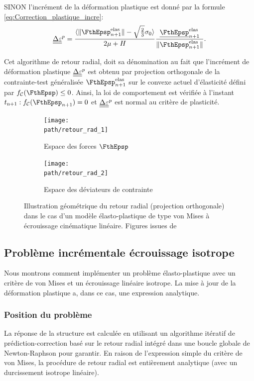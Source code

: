 \documentclass[10pt]{book}
\def\path{./fig}
\begin{document}
\begin{appendices}
\begin{enumerate}
SINON l'incrément de la déformation plastique est donné par la formule \eqref{eq:Correction_plastique_incre}:
$$\DeltaEpsP=\frac{\langle\Vert\FthEpsp_{n+1}^{\text{elas}}\Vert-\sqrt{\frac{2}{3}}\sigma_{0}\rangle}{2\mu+H}\frac{\vec{\FthEpsp}_{n+1}^{\text{elas}}}{\Vert \FthEpsp_{n+1}^{\text{elas}}\Vert}.$$
\end{enumerate}
Cet algorithme de retour radial, doit sa dénomination au fait que l'incrément de déformation plastique $\underline{\underline{\Delta}}\underline{\underline{\varepsilon}}^{p}$ est obtenu par projection orthogonale de la contrainte-test généralisée $\FthEpsp_{n+1}^{\text{elas}}$ sur le convexe actuel d'élasticité défini par $\FChargeConvexe(\FthEpsp) \leq 0$. Ainsi, la loi de comportement est vérifiée à l'instant $t_{\mathrm{n}+1}:\FChargeConvexe(\FthEpsp_{n+1})=0$ et $\underline{\underline{\Delta}}\underline{\underline{\varepsilon}}^{p}$ est normal au critère de plasticité.
\begin{figure}[!h]
\begin{subfigure}[b]{0.49\textwidth}
\centering \texttt{[image: \\path/retour\_rad\_1]}
\caption{Espace des forces $\FthEpsp$}
\end{subfigure}
\begin{subfigure}[b]{0.49\textwidth}
\centering \texttt{[image: \\path/retour\_rad\_2]}
\caption{Espace des déviateurs de contrainte}
\end{subfigure}
\caption{Illustration géométrique du \og retour radial \fg{} (projection orthogonale) dans le cas d'un modèle élasto-plastique de type von Mises à écrouissage cinématique linéaire. Figures issues de \cite{maitournam2017materiaux}}
\end{figure}
\subsection{Problème incrémentale écrouissage isotrope}
Nous montrons comment implémenter un problème élasto-plastique avec un critère de von Mises et un écrouissage linéaire isotrope. La mise à jour de la déformation plastique a, dans ce cas, une expression analytique. 
\subsubsection{Position du problème}
La réponse de la structure est calculée en utilisant un algorithme itératif de prédiction-correction basé sur le retour radial intégré dans une boucle globale de Newton-Raphson pour garantir. En raison de l'expression simple du critère de von Mises, la procédure de retour radial est entièrement analytique (avec un durcissement isotrope linéaire).

\end{appendices}
\end{document}
